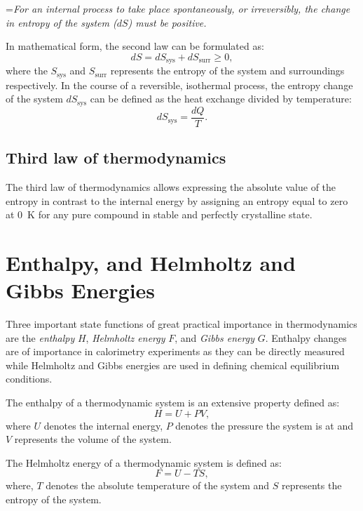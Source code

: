 	\hangindent=\parindent \emph{For an internal process to take place spontaneously, or irreversibly, the change in entropy of the system ($dS$) must be positive.}

	\noindent In mathematical form, the second law can be formulated as:
	\begin{equation}\label{eqn:slot}
		dS = dS_\text{sys} + dS_\text{surr} \geq 0,
	\end{equation}
	where the $S_\text{sys}$ and $S_\text{surr}$ represents the entropy of the system and surroundings respectively.
	In the course of a reversible, isothermal process, the entropy change of the system $dS_\text{sys}$   can be defined as the heat exchange divided by temperature:
	\begin{equation}\label{eqn:slotrev}
		dS_\text{sys} = \frac{dQ}{T}.
	\end{equation}

	\subsection{Third law of thermodynamics}
	The third law of thermodynamics allows expressing the absolute value of the entropy in contrast to the internal energy by assigning an entropy equal to zero at \SI{0}{\kelvin} for any pure compound in stable and perfectly crystalline state.

\section{Enthalpy, and Helmholtz and Gibbs Energies}
		Three important state functions of great practical importance in thermodynamics are the \emph{enthalpy} $H$, \emph{Helmholtz energy} $F$, and \emph{Gibbs energy} $G$. Enthalpy changes are of importance in calorimetry experiments as they can be directly measured while Helmholtz and Gibbs energies are used in defining chemical equilibrium conditions.

		The enthalpy of a thermodynamic system is an extensive property defined as:
		\begin{equation}
			H = U + PV,
		\end{equation}
		where $U$ denotes the internal energy, $P$ denotes the pressure the system is at and $V$ represents the volume of the system.

		The Helmholtz energy of a thermodynamic system is defined as:
		\begin{equation}
			F = U - TS,
		\end{equation}
		where, $T$ denotes the absolute temperature of the system and $S$ represents the entropy of the system.

